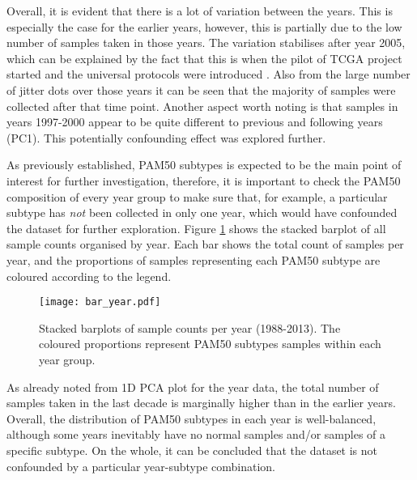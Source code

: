     Overall, it is evident that there is a lot of variation between the years. This is especially the case for the earlier years, however, this is partially due to the low number of samples taken in those years.  The variation stabilises after year 2005, which can be explained by the fact that this is when the pilot of TCGA project started and the universal protocols were introduced \cite{OverviewTCGA}. Also from the large number of jitter dots over those years it can be seen that the majority of samples were collected after that time point. Another aspect worth noting is that samples in years 1997-2000 appear to be quite different to previous and following years (PC1). This potentially confounding effect was explored further. \\
    \newline
    
    \newpage
    As previously established, PAM50 subtypes is expected to be the main point of interest for further investigation, therefore, it is important to check the PAM50 composition of every year group to make sure that, for example, a particular subtype has \textit{not} been collected in only one year, which would have confounded the dataset for further exploration. Figure \ref{fig:baryear} shows the stacked barplot of all sample counts organised by year. Each bar shows the total count of samples per year, and the proportions of samples representing each PAM50 subtype are coloured according to the legend. \\
    \newline
    
    
            \begin{figure}[!h]
            \centering
            \texttt{[image: bar\_year.pdf]}
            \caption[Stacked barplots of sample counts per year]{Stacked barplots of sample counts per year (1988-2013). The coloured proportions represent PAM50 subtypes samples within each year group. }
            \label{fig:baryear}
            \end{figure}
    
    As already noted from 1D PCA plot for the year data, the total number of samples taken in the last decade is marginally higher than in the earlier years. Overall, the distribution of PAM50 subtypes in each year is well-balanced,  although some years inevitably have no normal samples and/or samples of a specific subtype. On the whole, it can be concluded that the dataset is not confounded by a particular year-subtype combination.  
    
